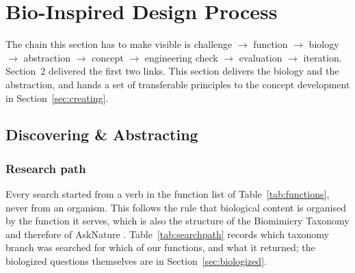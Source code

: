 \section{Bio-Inspired Design Process}

The chain this section has to make visible is
challenge $\rightarrow$ function $\rightarrow$ biology $\rightarrow$ abstraction
$\rightarrow$ concept $\rightarrow$ engineering check $\rightarrow$ evaluation
$\rightarrow$ iteration. Section~2 delivered the first two links. This section
delivers the biology and the abstraction, and hands a set of transferable
principles to the concept development in Section~\ref{sec:creating}.

\subsection{Discovering \& Abstracting}
\label{sec:discovering}

\subsubsection{Research path}
\label{sec:researchpath}

Every search started from a verb in the function list of
Table~\ref{tab:functions}, never from an organism. This follows the rule that
biological content is organised by the function it serves, which is also the
structure of the Biomimicry Taxonomy and therefore of AskNature
\parencite{asknature}. Table~\ref{tab:searchpath} records which taxonomy branch
was searched for which of our functions, and what it returned; the biologized
questions themselves are in Section~\ref{sec:biologized}.

